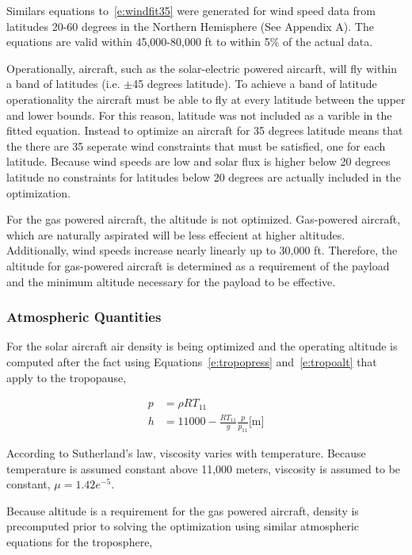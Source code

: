 \documentclass[]{aiaa-tc}%
\begin{document}
Similars equations to~\eqref{e:windfit35} were generated for wind speed data from latitudes 20-60 degrees in the Northern Hemisphere (See Appendix A).  The equations are valid within 45,000-80,000 ft to within 5\% of the actual data. 

Operationally, aircraft, such as the solar-electric powered aircarft, will fly within a band of latitudes (i.e. $\pm$45 degrees latitude).  
To achieve a band of latitude operationality the aircraft must be able to fly at every latitude between the upper and lower bounds.  
For this reason, latitude was not included as a varible in the fitted equation.  
Instead to optimize an aircraft for 35 degrees latitude means that the there are 35 seperate wind constraints that must be satisfied, one for each latitude.
Because wind speeds are low and solar flux is higher below 20 degrees latitude no constraints for latitudes below 20 degrees are actually included in the optimization. 

For the gas powered aircraft, the altitude is not optimized.  
Gas-powered aircraft, which are naturally aspirated will be less effecient at higher altitudes.  
Additionally, wind speeds increase nearly linearly up to 30,000 ft.  
Therefore, the altitude for gas-powered aircraft is determined as a requirement of the payload and the minimum altitude necessary for the payload to be effective. 

\subsubsection{Atmospheric Quantities}

For the solar aircraft air density is being optimized and the operating altitude is computed after the fact using Equations~\ref{e:tropopress} and~\ref{e:tropoalt} \cite{isaatm} that apply to the tropopause, 

\begin{align}
    \label{e:tropopress}
    p &= \rho RT_{11} \\
    \label{e:tropoalt}
    h &= 11000 - \frac{RT_{11}}{g}\frac{p}{p_{11}} \text{[m]} 
\end{align}

According to Sutherland's law\cite{fluiddyhandbook}, viscosity varies with temperature.  Because temperature is assumed constant above 11,000 meters\cite{isaatm}, viscosity is assumed to be constant, $\mu=1.42e^{-5}$.

Because altitude is a requirement for the gas powered aircraft, density is precomputed prior to solving the optimization using similar atmospheric equations for the troposphere,\cite{isaatm} 
\end{document}
